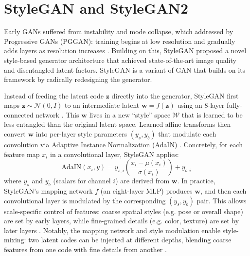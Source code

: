 \section{StyleGAN and StyleGAN2}

Early GANs suffered from instability and mode collapse, which \citet{karras2018progressivegrowinggansimproved} addressed by 
Progressive GANs (PGGAN): training begins at low resolution and gradually adds 
layers as resolution increases \citep{Melnik_2024}.
Building on this, StyleGAN \citet{karras2019stylebasedgeneratorarchitecturegenerative}
proposed a novel style-based generator architecture that achieved state-of-the-art image quality and disentangled latent factors.
StyleGAN is a variant of GAN that builds on its framework by radically redesigning the generator.

Instead of feeding the latent code $\mathbf{z}$ directly into the generator, 
StyleGAN first maps $\mathbf{z}\sim\mathcal{N}(0,I)$ to an intermediate latent $\mathbf{w}=f(\mathbf{z})$ using an 8-layer fully-connected network \citep{karras2019stylebasedgeneratorarchitecturegenerative}.
This $\mathbf{w}$ lives in a new “style” space $\mathcal{W}$ that is learned to be less entangled than the original latent space. 
Learned affine transforms then convert $\mathbf{w}$ into per-layer style parameters $(y_s,y_b)$ that modulate each convolution via Adaptive Instance Normalization (AdaIN) \citep{karras2019stylebasedgeneratorarchitecturegenerative,karras2020analyzingimprovingimagequality}.
Concretely, for each feature map $x_i$ in a convolutional layer, StyleGAN applies:
\begin{equation}
\text{AdaIN}(x_i, y) = y_{s,i} \left( \frac{x_i - \mu(x_i)}{\sigma(x_i)} \right) + y_{b,i}
\label{eq:adain}
\end{equation}
where $y_s$ and $y_b$ (scalars for channel $i$) are derived from $\mathbf{w}$.
 In practice, StyleGAN’s mapping network $f$ (an eight-layer MLP) produces $\mathbf{w}$, and then each convolutional layer is modulated by the corresponding $(y_s,y_b)$ pair.
 This allows scale-specific control of features: coarse spatial styles 
 (e.g. pose or overall shape) are set by early layers, while fine-grained details (e.g. color, texture) are set by later layers \cite{Melnik_2024,karras2019stylebasedgeneratorarchitecturegenerative}.
Notably, the mapping network and style modulation enable style-mixing: two latent codes can be injected at different depths, blending coarse features from one code with fine details from another \citep{Melnik_2024}.

